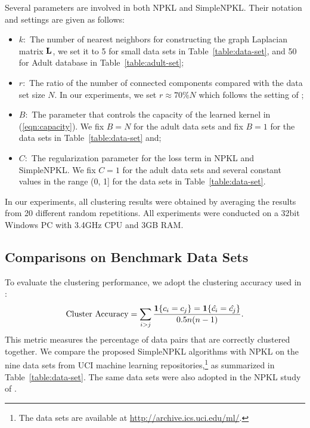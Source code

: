 Several parameters are involved in both NPKL and SimpleNPKL. Their notation and settings are given as follows:
\begin{itemize}
\item $k:$ The number of nearest neighbors for constructing the graph Laplacian matrix ${\bf L}$, we set it to 5 for small data sets in Table~\ref{table:data-set}, and 50 for Adult database in Table~\ref{table:adult-set}; \vspace{-0.1in}
\item $r:$ The ratio of the number of connected components compared with the data set size $N$. In our experiments, we set $r\approx70\% N$ which follows the setting of \cite{icml/HoiJL07};  \vspace{-0.1in}
\item $B:$ The parameter that controls the capacity of the learned kernel in (\ref{eqn:capacity}). We fix $B=N$ for the adult data sets and fix $B=1$ for the data sets in Table~\ref{table:data-set} and; \vspace{-0.1in}
\item $C:$ The regularization parameter for the loss term in NPKL and SimpleNPKL. We fix $C=1$ for the adult data sets and several constant values in the range (0, 1] for the data sets in Table~\ref{table:data-set}.
\end{itemize}

In our experiments, all clustering results were obtained by averaging the results from 20 different random repetitions. All experiments were conducted on a 32bit Windows PC with 3.4GHz CPU and 3GB RAM.

\subsection{Comparisons on Benchmark Data Sets}

To evaluate the clustering performance, we adopt the clustering accuracy used in \cite{icml/HoiJL07}:
\begin{eqnarray}
\mbox{Cluster~Accuracy} = \sum_{i>j} \frac{\1 \{c_i=c_j\} = \1 \{\hat{c_i} = \hat{c_j}\}}{0.5n(n - 1)}. \nonumber%
\end{eqnarray}
This metric measures the percentage of data pairs that are correctly clustered together. We compare the proposed SimpleNPKL algorithms with NPKL on the nine data sets from UCI machine learning repositories,\footnote{The data sets are available at \url{http://archive.ics.uci.edu/ml/}.} as summarized in Table~\ref{table:data-set}. The same data sets were also adopted in the NPKL study of \cite{icml/HoiJL07}.

